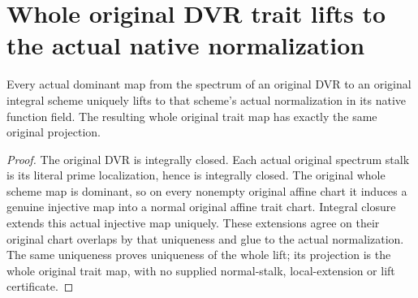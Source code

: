 \section{Whole original DVR trait lifts to the actual native normalization}
\begin{theorem}\label{thm:scheme-dvr-native-normalization-lift}
Every actual dominant map from the spectrum of an original DVR to an original integral scheme uniquely lifts to that scheme's actual normalization in its native function field. The resulting whole original trait map has exactly the same original projection.
\leanok
\end{theorem}
\begin{proof}
The original DVR is integrally closed. Each actual original spectrum stalk is its literal prime localization, hence is integrally closed. The original whole scheme map is dominant, so on every nonempty original affine chart it induces a genuine injective map into a normal original affine trait chart. Integral closure extends this actual injective map uniquely. These extensions agree on their original chart overlaps by that uniqueness and glue to the actual normalization. The same uniqueness proves uniqueness of the whole lift; its projection is the whole original trait map, with no supplied normal-stalk, local-extension or lift certificate.
\end{proof}
